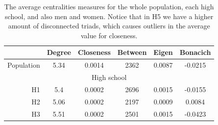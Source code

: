 \begin{table}[h]
    
    \centering

    \caption{The average centralities measures for the whole population, each high school, and also men and women. Notice that in H5 we have a higher amount of disconnected triads, which causes outliers in the average value for closeness.}
    \renewcommand{\arraystretch}{1.7}
    \begin{tabular}{rccccc|}
    \cline{2-6}
    \multicolumn{1}{l|}{}                                    & \multicolumn{1}{l}{\cellcolor[HTML]{FFFFC7}Degree} & \multicolumn{1}{l}{\cellcolor[HTML]{FFFFC7}Closeness} & \multicolumn{1}{l}{\cellcolor[HTML]{FFFFC7}Between} & \multicolumn{1}{l}{\cellcolor[HTML]{FFFFC7}Eigen} & \multicolumn{1}{l|}{\cellcolor[HTML]{FFFFC7}Bonacich} \\ \hline
    \multicolumn{1}{|l|}{\cellcolor[HTML]{FBDBB5}Population} & 5.34                                               & 0.0014                                                & 2362                                                & 0.0087                                            & -0.0215                                               \\ \hline
    \multicolumn{6}{|c|}{\cellcolor[HTML]{C0C0C0}High school}                                                                                                                                                                                                                                                                               \\ \hline
    \multicolumn{1}{|r|}{\cellcolor[HTML]{EFEFEF}H1}         & 5.4                                                & 0.0002                                                & 2696                                                & 0.0015                                            & -0.0155                                               \\
    \multicolumn{1}{|r|}{\cellcolor[HTML]{EFEFEF}H2}         & 5.06                                               & 0.0002                                                & 2197                                                & 0.0009                                            & 0.0084                                                \\
    \multicolumn{1}{|r|}{\cellcolor[HTML]{EFEFEF}H3}         & 5.51                                               & 0.0002                                                & 2501                                                & 0.0015                                            & -0.0423                                               \\

\end{tabular}
\end{table}
